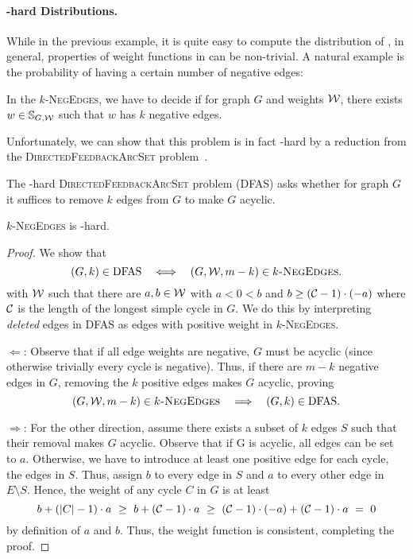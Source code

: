 \paragraph{\NP-hard Distributions.}
While in the previous example, it is quite easy to compute the distribution of \states, in general, properties of weight functions in \states can be non-trivial.
A natural example is the probability of having a certain number of negative edges:

\begin{definition}
  In the \textsc{$k$-NegEdges}, we have to decide if for graph $G$ and weights $\mathcal W$, there exists $w \in \mathbb{S}_{G, \mathcal W}$ such that $w$ has $k$ negative edges.
\end{definition}

\noindent Unfortunately, we can show that this problem is in fact \NP-hard by a reduction from the \textsc{DirectedFeedbackArcSet} problem~\cite{DBLP:conf/coco/Karp72}.
\begin{definition}
  The \NP-hard \textsc{DirectedFeedbackArcSet} problem (DFAS) asks whether for graph $G$ it suffices to remove $k$ edges from $G$ to make $G$ acyclic.
\end{definition}

\begin{theorem}  
  \textsc{$k$-NegEdges} is \NP-hard.
\end{theorem}
\begin{proof}
  We show that \[
    (G, k) \in \text{DFAS}\quad\Longleftrightarrow\quad(G, \mathcal W, m - k) \in \textsc{$k$-NegEdges}.
  \] with $\mathcal W$ such that there are $a, b \in \mathcal W$ with $a < 0 < b$ and $b \geq (\mathcal{C} - 1) \cdot (-a)$ where $\mathcal{C}$ is the length of the longest simple cycle in $G$.
  We do this by interpreting \emph{deleted} edges in DFAS as edges with positive weight in \textsc{$k$-NegEdges}.

  \underline{$\Longleftarrow$}:
  Observe that if all edge weights are negative, $G$ must be acyclic (since otherwise trivially every cycle is negative).
  Thus, if there are $m - k$ negative edges in $G$, removing the $k$ positive edges makes $G$ acyclic, proving \[
    (G, \mathcal W, m - k) \in \textsc{$k$-NegEdges}\quad\Longrightarrow\quad(G, k) \in \text{DFAS}.
  \] 

  \underline{$\Longrightarrow$}:
  For the other direction, assume there exists a subset of $k$ edges $S$ such that their removal makes $G$ acyclic.
  Observe that if G is acyclic, all edges can be set to $a$. 
  Otherwise, we have to introduce at least one positive edge for each cycle, \ie the edges in $S$.
  Thus, assign $b$ to every edge in $S$ and $a$ to every other edge in $E \setminus S$.
  Hence, the weight of any cycle $C$ in $G$ is at least \[
    b + (|C| - 1) \cdot a \,\,\geq\,\, b + (\mathcal{C} - 1) \cdot a \,\,\geq\,\, (\mathcal{C} - 1) \cdot (-a) + (\mathcal{C} - 1) \cdot a \,\,=\,\, 0
  \] by definition of $a$ and $b$.
  Thus, the weight function is consistent, completing the proof.
\end{proof}


